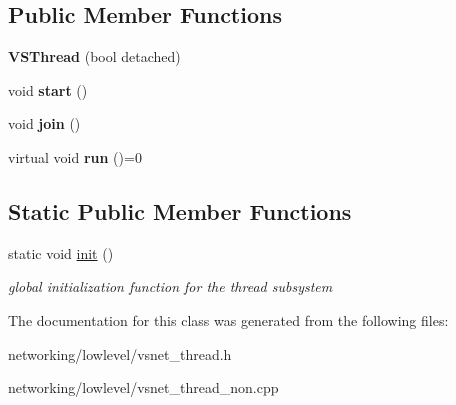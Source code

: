 \subsection*{Public Member Functions}
\begin{DoxyCompactItemize}
\item 
{\bfseries V\+S\+Thread} (bool detached)\hypertarget{classVSThread_a4124be5192537306e6ee2f57153c454c}{}\label{classVSThread_a4124be5192537306e6ee2f57153c454c}

\item 
void {\bfseries start} ()\hypertarget{classVSThread_a3a105a18863ca585c56c2f0212db23e5}{}\label{classVSThread_a3a105a18863ca585c56c2f0212db23e5}

\item 
void {\bfseries join} ()\hypertarget{classVSThread_affc2d9767feb54acd65913542b1c9ce6}{}\label{classVSThread_affc2d9767feb54acd65913542b1c9ce6}

\item 
virtual void {\bfseries run} ()=0\hypertarget{classVSThread_ab0b6dd216d8077510886ed3b55b138c8}{}\label{classVSThread_ab0b6dd216d8077510886ed3b55b138c8}

\end{DoxyCompactItemize}
\subsection*{Static Public Member Functions}
\begin{DoxyCompactItemize}
\item 
static void \hyperlink{classVSThread_ae684332dadd8400ed047630540c11a77}{init} ()\hypertarget{classVSThread_ae684332dadd8400ed047630540c11a77}{}\label{classVSThread_ae684332dadd8400ed047630540c11a77}

\begin{DoxyCompactList}\small\item\em global initialization function for the thread subsystem \end{DoxyCompactList}\end{DoxyCompactItemize}


The documentation for this class was generated from the following files\+:\begin{DoxyCompactItemize}
\item 
networking/lowlevel/vsnet\+\_\+thread.\+h\item 
networking/lowlevel/vsnet\+\_\+thread\+\_\+non.\+cpp\end{DoxyCompactItemize}
